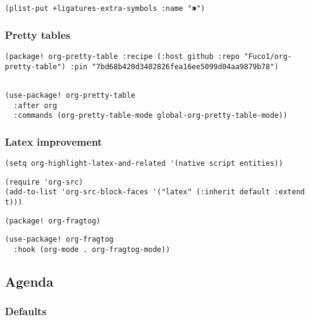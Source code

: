 \documentclass[c]{article}
\theoremstyle{plain}%
\theoremstyle{definition}
\theoremstyle{remark}
\begin{document}
\begin{verbatim}
(plist-put +ligatures-extra-symbols :name "⁍")
\end{verbatim}
\subsubsection{Pretty tables}
\label{sec:org5963126}
\begin{verbatim}
(package! org-pretty-table :recipe (:host github :repo "Fuco1/org-pretty-table") :pin "7bd68b420d3402826fea16ee5099d04aa9879b78")
\end{verbatim}
\begin{verbatim}

(use-package! org-pretty-table
  :after org
  :commands (org-pretty-table-mode global-org-pretty-table-mode))
\end{verbatim}
\subsubsection{Latex improvement}
\label{sec:org54ad584}
\begin{verbatim}
(setq org-highlight-latex-and-related '(native script entities))
\end{verbatim}
\begin{verbatim}
(require 'org-src)
(add-to-list 'org-src-block-faces '("latex" (:inherit default :extend t)))
\end{verbatim}
\begin{verbatim}
(package! org-fragtog)
\end{verbatim}
\begin{verbatim}
(use-package! org-fragtog
  :hook (org-mode . org-fragtog-mode))
\end{verbatim}
\subsection{Agenda}
\label{sec:orgb27f9c6}
\subsubsection{Defaults}
\label{sec:org1f5b424}
\end{document}
